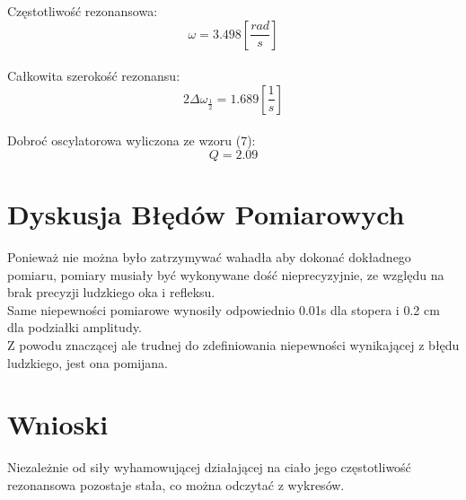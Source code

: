 \documentclass[]{article}
\begin{document}
	Częstotliwość rezonansowa:
	$$\omega = 3.498 \left[ \frac{rad}{s}\right]$$\\
	Całkowita szerokość rezonansu:
	$$2\Delta\omega_{\frac{1}{2}} = 1.689 \left[ \frac{1}{s}\right] $$\\	
	Dobroć oscylatorowa wyliczona ze wzoru (7):
	$$Q = 2.09$$
	
	\section{Dyskusja Błędów Pomiarowych}
	Ponieważ nie można było zatrzymywać wahadła aby dokonać dokładnego pomiaru, pomiary musiały być wykonywane dość nieprecyzyjnie, ze względu na brak precyzji ludzkiego oka i refleksu.\\
	Same niepewności pomiarowe wynosiły odpowiednio 0.01s dla stopera i 0.2 cm dla podziałki amplitudy.\\
	Z powodu znaczącej ale trudnej do zdefiniowania niepewności wynikającej z błędu ludzkiego, jest ona pomijana.
	\section{Wnioski}
	Niezależnie od siły wyhamowującej działającej na ciało jego częstotliwość rezonansowa pozostaje stała, co można odczytać z wykresów.
\end{document}
